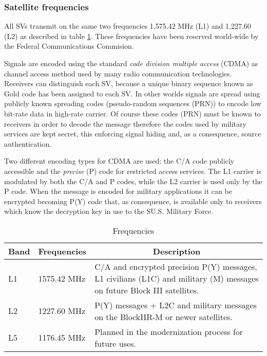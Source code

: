 \documentclass[PhD,binding=0.6cm]{dithesis}
\newcommand{\head}[1]{\textnormal{\textbf{#1}}}
\newcommand{\normal}[1]{\multicolumn{1}{|c|}{#1}}
\begin{document}
\subsubsection{Satellite frequencies}

All SVs transmit on  the same two frequencies 1,575.42 MHz (L1) and 1,227.60 (L2) as described in table \ref{tab:GPSFrequencies}.
These frequencies have been reserved world-wide  by the Federal Communications Commision.

Signals are encoded  using the standard \emph{code division multiple access} (CDMA) as channel access method used by many radio communication technologies. Receivers can distinguish each SV, because a unique binary sequence known as Gold code has been assigned to each SV. In other worlds signals are spread using publicly known spreading codes (pseudo-random sequences (PRN)) to encode low bit-rate data in high-rate carrier. Of course these codes (PRN) must be known to receivers in order to decode the message therefore the codes used by military services are kept secret, this enforcing signal hiding  and, as a consequence, source authentication.

Two different encoding types for CDMA are used: the C/A code publicly accessible and the \emph{precise} (P) code for restricted access services. The L1 carrier is modulated by both the C/A and P codes, while the L2 carrier is used only by the P code. When the message is encoded for military applications it can be encrypted becoming P(Y) code that, as consequence, is available only to receivers which know the decryption key in use to the 
SU.S. Military Force.

\begin{table}[htdp]
\caption{Frequencies}
\begin{center}
\begin{tabular}{|l|l|p{9cm}|}
\hline
\head{Band} & \head{Frequencies} & \normal{ \head{ Description}} \\
\hline
L1 & 1575.42 MHz & C/A and encrypted precision P(Y) messages, L1 civilians (L1C) and military (M) messages on future Block III satellites.\\
\hline
L2 & 1227.60 MHz & P(Y) messages + L2C and military messages on the BlockIIR-M or newer satellites.\\

\hline
L5 & 1176.45 MHz & Planned in the modernization process for future uses.\\

\hline
\end{tabular}
\end{center}
\label{tab:GPSFrequencies}
\end{table}%
\end{document}
